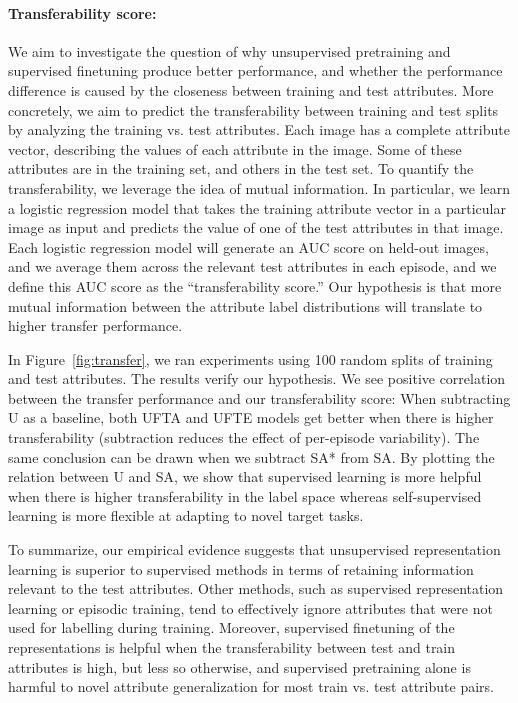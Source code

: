 \savespacebeforesection
\paragraph{Transferability score:}
We aim to investigate the question of why unsupervised pretraining and
supervised finetuning produce better performance, and whether the performance
difference is caused by the closeness between training and test attributes.
More concretely, we aim to predict the transferability between training and
test splits by analyzing the training vs. test attributes. Each image has a
complete attribute vector, describing the values of each attribute in the
image. Some of these attributes are in the training set, and others in the test
set. To quantify the transferability, we leverage the idea of mutual
information. In particular, we learn a logistic regression model that takes the
training attribute vector in a particular image as input and predicts the value
of one of the test attributes in that image. Each logistic regression model
will generate an AUC score on held-out images, and we average them across the
relevant test attributes in each episode, and we define this AUC score as the
``transferability score.'' Our hypothesis is that more mutual information
between the attribute label distributions will translate to higher transfer
performance.

In Figure~\ref{fig:transfer}, we ran experiments using 100 random splits of
training and test attributes. The results verify our hypothesis. We see
positive correlation between the transfer performance and our transferability
score: When subtracting U as a baseline, both UFTA and UFTE models get better
when there is higher transferability (subtraction reduces the effect of
per-episode variability). The same conclusion can be drawn when we subtract SA*
from SA. By plotting the relation between U and SA, we show that supervised
learning is more helpful when there is higher transferability in the label
space whereas self-supervised learning is more flexible at adapting to novel
target tasks.

To summarize, our empirical evidence suggests that unsupervised representation
learning is superior to supervised methods in terms of retaining information
relevant to the test attributes. Other methods, such as supervised
representation learning or episodic training, tend to effectively ignore
attributes that were not used for labelling during training. Moreover,
supervised finetuning of the representations is helpful when the
transferability between test and train attributes is high, but less so
otherwise, and supervised pretraining alone is harmful to novel attribute
generalization for most train vs. test attribute pairs.
